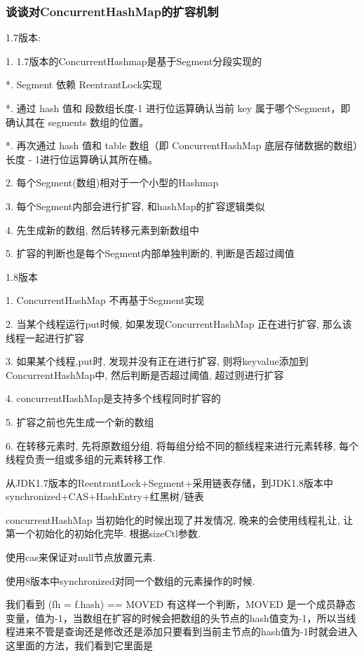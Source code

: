 \documentclass[UTF8]{ctexart}
\begin{document}
\subsubsection{谈谈对ConcurrentHashMap的扩容机制}
1.7版本: \par
1. 1.7版本的ConcurrentHashmap是基于Segment分段实现的\par
*. Segment 依赖 ReentrantLock实现 \par
*. 通过 hash 值和 段数组长度-1 进行位运算确认当前 key 属于哪个Segment，即确认其在 segments 数组的位置。\par
*. 再次通过 hash 值和 table 数组（即 ConcurrentHashMap 底层存储数据的数组）长度 - 1进行位运算确认其所在桶。\par


2. 每个Segment(数组)相对于一个小型的Hashmap \par
3. 每个Segment内部会进行扩容, 和hashMap的扩容逻辑类似 \par
4. 先生成新的数组, 然后转移元素到新数组中 \par
5. 扩容的判断也是每个Segment内部单独判断的, 判断是否超过阈值 \par
1.8版本 \par
1. ConcurrentHashMap 不再基于Segment实现 \par
2. 当某个线程运行put时候, 如果发现ConcurrentHashMap 正在进行扩容, 那么该线程一起进行扩容 \par
3. 如果某个线程,put时, 发现并没有正在进行扩容, 则将keyvalue添加到ConcurrentHashMap中, 然后判断是否超过阈值, 超过则进行扩容 \par
4. concurrentHashMap是支持多个线程同时扩容的 \par
5. 扩容之前也先生成一个新的数组 \par
6. 在转移元素时, 先将原数组分组, 将每组分给不同的额线程来进行元素转移, 每个线程负责一组或多组的元素转移工作. \par

从JDK1.7版本的ReentrantLock+Segment+采用链表存储，到JDK1.8版本中synchronized+CAS+HashEntry+红黑树/链表


concurrentHashMap 当初始化的时候出现了并发情况, 晚来的会使用线程礼让, 让第一个初始化的初始化完毕. 根据sizeCtl参数.

使用cas来保证对null节点放置元素.

使用8版本中synchronized对同一个数组的元素操作的时候.

我们看到 (fh = f.hash) == MOVED 有这样一个判断，MOVED 是一个成员静态变量，值为-1，当数组在扩容的时候会把数组的头节点的hash值变为-1，所以当线程进来不管是查询还是修改还是添加只要看到当前主节点的hash值为-1时就会进入这里面的方法，我们看到它里面是
\end{document}
